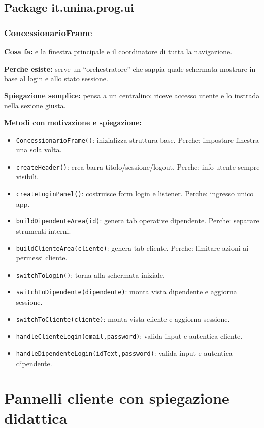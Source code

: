 \documentclass[12pt,a4paper]{article}
\begin{document}
\subsection{Package it.unina.prog.ui}

\subsubsection*{ConcessionarioFrame}
\textbf{Cosa fa:}
e la finestra principale e il coordinatore di tutta la navigazione.

\textbf{Perche esiste:}
serve un ``orchestratore'' che sappia quale schermata mostrare in base al login e allo stato sessione.

\textbf{Spiegazione semplice:}
pensa a un centralino: riceve accesso utente e lo instrada nella sezione giusta.

\textbf{Metodi con motivazione e spiegazione:}
\begin{itemize}
  \item \texttt{ConcessionarioFrame()}: inizializza struttura base. Perche: impostare finestra una sola volta.
  \item \texttt{createHeader()}: crea barra titolo/sessione/logout. Perche: info utente sempre visibili.
  \item \texttt{createLoginPanel()}: costruisce form login e listener. Perche: ingresso unico app.
  \item \texttt{buildDipendenteArea(id)}: genera tab operative dipendente. Perche: separare strumenti interni.
  \item \texttt{buildClienteArea(cliente)}: genera tab cliente. Perche: limitare azioni ai permessi cliente.
  \item \texttt{switchToLogin()}: torna alla schermata iniziale.
  \item \texttt{switchToDipendente(dipendente)}: monta vista dipendente e aggiorna sessione.
  \item \texttt{switchToCliente(cliente)}: monta vista cliente e aggiorna sessione.
  \item \texttt{handleClienteLogin(email,password)}: valida input e autentica cliente.
  \item \texttt{handleDipendenteLogin(idText,password)}: valida input e autentica dipendente.
\end{itemize}

\section{Pannelli cliente con spiegazione didattica}
\end{document}
